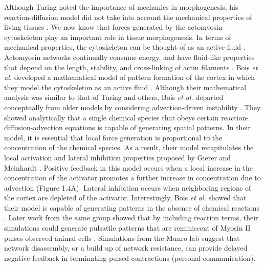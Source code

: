 \documentclass{ucetd}
\begin{document}
Although Turing noted the importance of mechanics in morphogenesis, his reaction-diffusion model did not take into account the mechanical properties of living tissues \cite{Howard:2011da}.  We now know that forces generated by the actomyosin cytoskeleton play an important role in tissue morphogenesis.  In terms of mechanical properties, the cytoskeleton can be thought of as an active fluid \cite{Kruse:2004il}.  Actomyosin networks continually consume energy, and have fluid-like properties that depend on the length, stability, and cross-linking of actin filaments \cite{Kruse:2004il}.  Bois \textit{et al.} developed a mathematical model of pattern formation of the cortex in which they model the cytoskeleton as an active fluid \cite{Kruse:2004il, Bois:2011kx}.  Although their mathematical analysis was similar to that of Turing and others, Bois \textit{et al.} departed conceptually from older models by considering advection-driven instability \cite{Turing:1952vn,Gierer:1972vq,Segel:1972wb,Bois:2011kx}.  They showed analytically that a single chemical species that obeys certain reaction-diffusion-advection equations is capable of generating spatial patterns.  In their model, it is essential that local force generation is proportional to the concentration of the chemical species.  As a result, their model recapitulates the local activation and lateral inhibition properties proposed by Gierer and Meinhardt \cite{Gierer:1972vq}.  Positive feedback in this model occurs when a local increase in the concentration of the activator promotes a further increase in concentration due to advection (Figure 1.4A).  Lateral inhibition occurs when neighboring regions of the cortex are depleted of the activator.  Interestingly, Bois \textit{et al.} showed that their model is capable of generating patterns in the absence of chemical reactions \cite{Bois:2011kx}.  Later work from the same group showed that by including reaction terms, their simulations could generate pulsatile patterns that are reminiscent of Myosin II pulses observed animal cells \cite{Kumar:2014ux, Munro:2004jk}.  Simulations from the Munro lab suggest that network disassembly, or a build up of network resistance, can provide delayed negative feedback in terminating pulsed contractions (personal communication).


\end{document}
